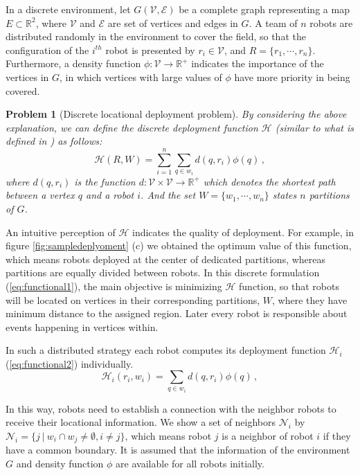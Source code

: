 \documentclass[twocolumn]{svjour3}       %
\newtheorem{myprob}{Problem}
\begin{document}
In a discrete environment, let $G(\mathcal V,\mathcal E)$ be a complete graph representing a map  $E \subset \mathbb{R}^2$, where $\mathcal V$ and $\mathcal E$ are set of vertices and edges in $G$. 
%
A team of $n$ robots are distributed randomly in the environment to cover the field, so that the configuration of the $i^{th}$ robot is presented by $r_i \in \mathcal V$, and $R=\{r_1,\cdots,r_n \}$. Furthermore, a density function $\phi: \mathcal{V} \rightarrow \mathbb{R}^+$ indicates the importance of the vertices in $G$, in which vertices with large values of $\phi$ have more priority in being covered. 
%
\begin{myprob}[Discrete locational deployment problem]
\label{Prob:deployment}
\qquad \qquad \qquad
%
\textnormal{
By considering the above explanation, we can define the discrete deployment function $\mathcal{H}$ (similar to what is defined in \cite{Yun2013}) as follows:}
%
\begin{equation}\label{eq:functional1}
\mathcal{H}(R,W) =
\sum_{i = 1}^{n} \sum_{q \in w_i}
d(q, r_i)\phi(q) \,,
\end{equation}
%
\textnormal{
where $d(q,r_i)$ is the function $d:\mathcal V \times \mathcal V \rightarrow \mathbb R^+$ which denotes the shortest path between a vertex $q$ and a robot $i$. And the set $W=\{w_1,\cdots,w_n\}$ states $n$ partitions of $G$.}
\end{myprob}

An intuitive perception of $\mathcal{H}$ indicates the quality of deployment. For example, in figure \ref{fig:sampledeplyoment} (c) we obtained the optimum value of this function, which means robots deployed at the center of dedicated partitions, whereas partitions are equally divided between robots.
%
In this discrete formulation (\ref{eq:functional1}), the main objective is minimizing $\mathcal{H}$ function, so that robots will be located on vertices in their corresponding partitions, $W$, where they have minimum distance to the assigned region. Later every robot is responsible about events happening in vertices within.

In such a distributed strategy each robot computes its deployment function $\mathcal{H}_i$ (\ref{eq:functional2}) individually. 
%
\begin{equation}
\label{eq:functional2}
\mathcal{H}_{i}(r_i,w_i) = \sum_{q \in w_i}
d(q, r_i)\phi(q) \,,
\end{equation}

In this way, robots need to establish a connection with the neighbor robots to receive their locational information. We show a set of neighbors $\mathcal{N}_i$ by $\mathcal N_i=\{j~|~w_i \cap w_j \neq \emptyset, i \neq j \}$, which means robot $j$ is a neighbor of robot $i$ if they have a common boundary. It is assumed that the information of the environment $G$ and density function $\phi$ are available for all robots initially. 
\end{document}
